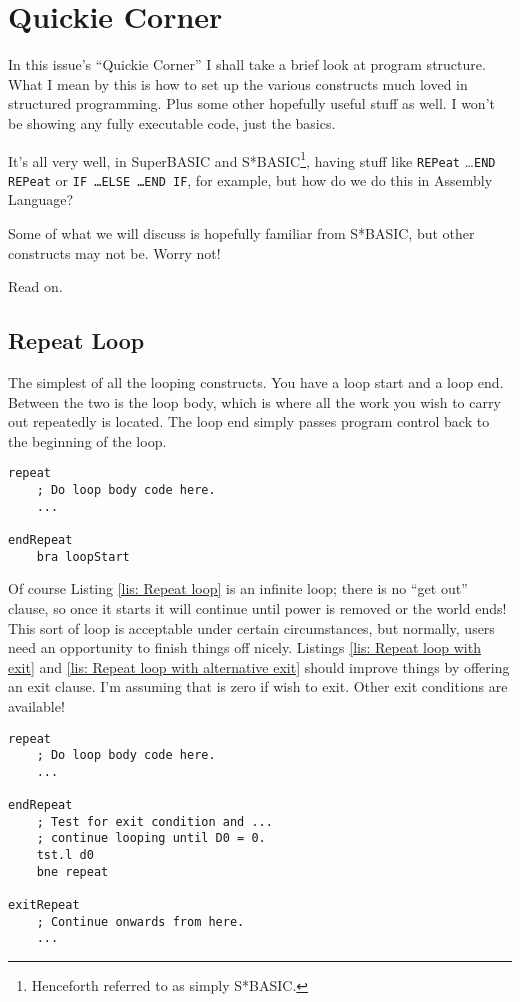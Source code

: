 
\chapter{Quickie Corner}

In this issue's ``Quickie Corner'' I shall take a brief look at program structure. What I mean by this is how to set up the various constructs much loved in structured programming. Plus some other hopefully useful stuff as well. I won't be showing any fully executable code, just the basics.

It's all very well, in SuperBASIC and S*BASIC\footnote{Henceforth referred to as simply S*BASIC.}, having stuff like \texttt{REPeat} \ldots \texttt{END REPeat} or \texttt{IF \ldots ELSE \ldots END IF}, for example, but how do we do this in Assembly Language? 

Some of what we will discuss is hopefully familiar from S*BASIC, but other constructs may not be. Worry not!

Read on.

\section{Repeat Loop}

The simplest of all the looping constructs. You have a loop start and a loop end. Between the two is the loop body, which is where all the work you wish to carry out repeatedly is located. The loop end simply passes program control back to the beginning of the loop.

\begin{lstlisting}[caption={REPEAT \ldots END REPEAT},label={lis: Repeat loop}]
repeat
    ; Do loop body code here.
    ...

endRepeat
    bra loopStart
\end{lstlisting}

Of course Listing \ref{lis: Repeat loop} is an infinite loop; there is no ``get out'' clause, so once it starts it will continue until power is removed or the world ends! This sort of loop is acceptable under certain circumstances, but normally, users need an opportunity to finish things off nicely. Listings \ref{lis: Repeat loop with exit} and \ref{lis: Repeat loop with alternative exit} should improve things by offering an exit clause. I'm assuming that  is zero if wish to exit. Other exit conditions are available!

\begin{lstlisting}[caption={REPEAT \ldots EXIT \ldots END REPEAT},label={lis: Repeat loop with exit}]
repeat
    ; Do loop body code here.
    ...
    
endRepeat
    ; Test for exit condition and ...
    ; continue looping until D0 = 0.
    tst.l d0   
    bne repeat
    
exitRepeat
    ; Continue onwards from here.
    ...
\end{lstlisting}

